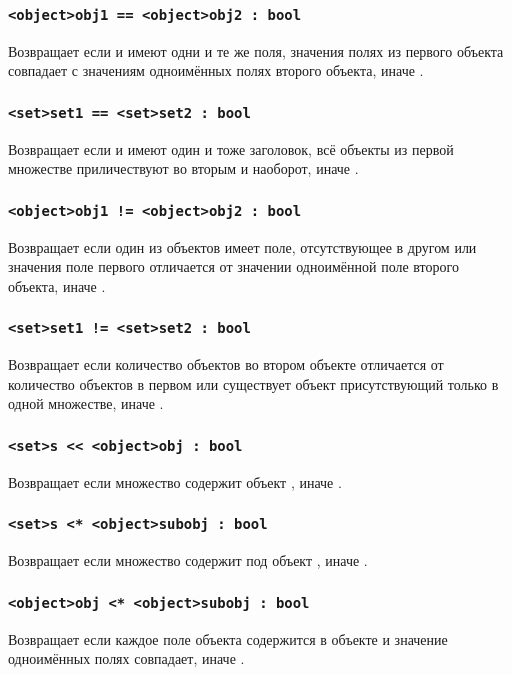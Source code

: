 \documentclass[a4paper, 14pt]{extarticle}
\begin{document}
\subsubsection{\lstinline`<object>obj1 == <object>obj2 : bool`}
	Возвращает  если  и  имеют одни и те же поля, значения полях из первого объекта совпадает с значениям одноимённых полях второго объекта, иначе .

\subsubsection{\lstinline`<set>set1 == <set>set2 : bool`}
	Возвращает  если  и  имеют один и тоже заголовок, всё объекты из первой множестве приличествуют во вторым и наоборот, иначе .

\subsubsection{\lstinline`<object>obj1 != <object>obj2 : bool`}
	Возвращает  если один из объектов имеет поле, отсутствующее в другом или значения поле первого отличается от значении одноимённой поле второго объекта, иначе . 

\subsubsection{\lstinline`<set>set1 != <set>set2 : bool`}
	Возвращает  если количество объектов во втором объекте отличается от количество объектов в первом или существует объект присутствующий только в одной множестве, иначе .

\subsubsection{\lstinline`<set>s << <object>obj : bool`}
	Возвращает  если множество  содержит объект , иначе .

\subsubsection{\lstinline`<set>s <* <object>subobj : bool`}
	Возвращает  если множество  содержит под объект , иначе .

\subsubsection{\lstinline`<object>obj <* <object>subobj : bool`}
	Возвращает  если каждое поле объекта  содержится в объекте  и значение одноимённых полях совпадает, иначе .
\end{document}
